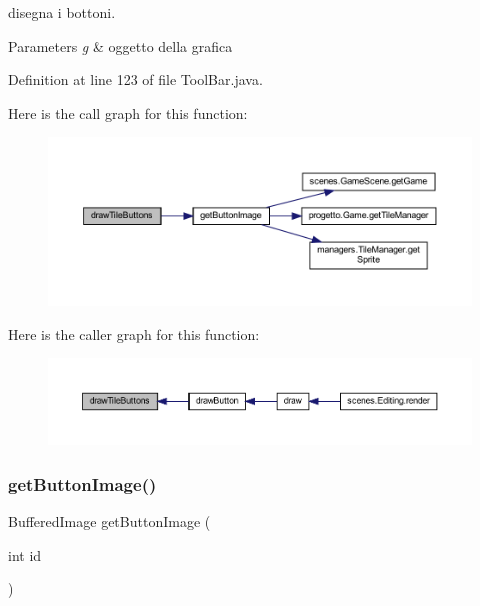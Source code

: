 disegna i bottoni. 


\begin{DoxyParams}{Parameters}
{\em g} & oggetto della grafica \\
\hline
\end{DoxyParams}


Definition at line 123 of file Tool\+Bar.\+java.

Here is the call graph for this function\+:\nopagebreak
\begin{figure}[H]
\begin{center}
\leavevmode
\includegraphics[width=350pt]{classui_1_1_tool_bar_a55c79e1185fb66ae98edacc2c7d5c302_cgraph}
\end{center}
\end{figure}
Here is the caller graph for this function\+:\nopagebreak
\begin{figure}[H]
\begin{center}
\leavevmode
\includegraphics[width=350pt]{classui_1_1_tool_bar_a55c79e1185fb66ae98edacc2c7d5c302_icgraph}
\end{center}
\end{figure}
\mbox{\label{classui_1_1_tool_bar_abe2e2af5c0d57248464e8b607c41a36f}} 
\subsubsection{\texorpdfstring{get\+Button\+Image()}{getButtonImage()}}
{\footnotesize\ttfamily Buffered\+Image get\+Button\+Image (\begin{DoxyParamCaption}\item[{int}]{id }\end{DoxyParamCaption})}



